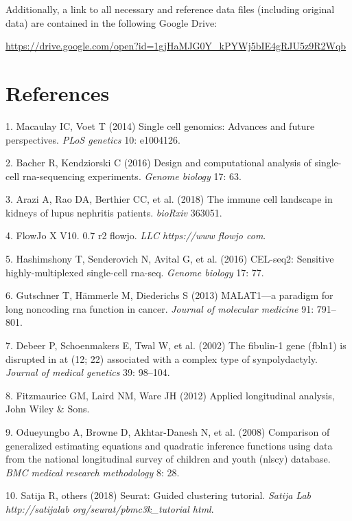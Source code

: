 \documentclass[12pt,]{article}
\begin{document}
Additionally, a link to all necessary and reference data files
(including original data) are contained in the following Google Drive:

\url{https://drive.google.com/open?id=1gjHaMJG0Y_kPYWj5bIE4gRJU5z9R2Wqb}

\hypertarget{references}{%
\section{References}\label{references}}



\hypertarget{refs}{}
\leavevmode\hypertarget{ref-macaulay2014single}{}%
1. Macaulay IC, Voet T (2014) Single cell genomics: Advances and future
perspectives. \emph{PLoS genetics} 10: e1004126.

\leavevmode\hypertarget{ref-bacher2016design}{}%
2. Bacher R, Kendziorski C (2016) Design and computational analysis of
single-cell rna-sequencing experiments. \emph{Genome biology} 17: 63.

\leavevmode\hypertarget{ref-arazi2018immune}{}%
3. Arazi A, Rao DA, Berthier CC, et al. (2018) The immune cell landscape
in kidneys of lupus nephritis patients. \emph{bioRxiv} 363051.

\leavevmode\hypertarget{ref-flowjov10}{}%
4. FlowJo X V10. 0.7 r2 flowjo. \emph{LLC https://www flowjo com}.

\leavevmode\hypertarget{ref-hashimshony2016cel}{}%
5. Hashimshony T, Senderovich N, Avital G, et al. (2016) CEL-seq2:
Sensitive highly-multiplexed single-cell rna-seq. \emph{Genome biology}
17: 77.

\leavevmode\hypertarget{ref-gutschner2013malat1}{}%
6. Gutschner T, Hämmerle M, Diederichs S (2013) MALAT1---a paradigm for
long noncoding rna function in cancer. \emph{Journal of molecular
medicine} 91: 791--801.

\leavevmode\hypertarget{ref-debeer2002fibulin}{}%
7. Debeer P, Schoenmakers E, Twal W, et al. (2002) The fibulin-1 gene
(fbln1) is disrupted in at (12; 22) associated with a complex type of
synpolydactyly. \emph{Journal of medical genetics} 39: 98--104.

\leavevmode\hypertarget{ref-fitzmaurice2012applied}{}%
8. Fitzmaurice GM, Laird NM, Ware JH (2012) Applied longitudinal
analysis, John Wiley \& Sons.

\leavevmode\hypertarget{ref-odueyungbo2008comparison}{}%
9. Odueyungbo A, Browne D, Akhtar-Danesh N, et al. (2008) Comparison of
generalized estimating equations and quadratic inference functions using
data from the national longitudinal survey of children and youth (nlscy)
database. \emph{BMC medical research methodology} 8: 28.

\leavevmode\hypertarget{ref-satija2018seurat}{}%
10. Satija R, others (2018) Seurat: Guided clustering tutorial.
\emph{Satija Lab http://satijalab org/seurat/pbmc3k\_tutorial html}.
\end{document}
